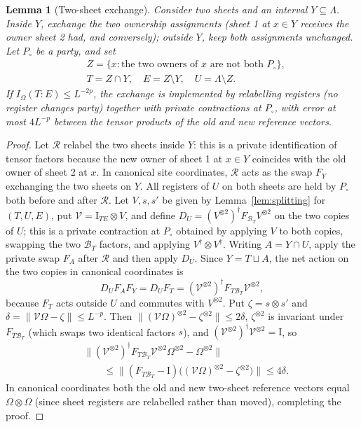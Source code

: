 \documentclass[aps,prx,reprint,superscriptaddress,floatfix,nofootinbib,longbibliography,amsmath,amssymb]{revtex4-2}
\newcommand{\id}{\mathrm{I}}
\newcommand{\norm}[1]{\lVert #1\rVert}
\newcommand{\cB}{\mathcal B}
\newcommand{\Om}{\Omega}
\newcommand{\Lam}{\Lambda}
\theoremstyle{plain}
\newtheorem{lemma}[theorem]{Lemma}
\theoremstyle{definition}
\begin{document}
\begin{lemma}[Two-sheet exchange]\label{lem:exchange}
Consider two sheets and an interval $Y\subseteq\Lam$. Inside $Y$, exchange
the two ownership assignments (sheet 1 at $x\in Y$ receives the owner sheet 2
had, and conversely); outside $Y$, keep both assignments unchanged. Let $P_\circ$ be a party, and set
\[
\begin{split}
 &Z=\{x:\text{the two owners of }x\text{ are not both }P_\circ\},\\
 &T=Z\cap Y,\quad E=Z\setminus Y,\quad U=\Lam\setminus Z .
\end{split}
\]
If $I_\Om(T:E)\le L^{-2p}$, the exchange is implemented by relabelling
registers (no register changes party) together with private contractions at
$P_\circ$, with error at most $4L^{-p}$ between the tensor products of the old and
new reference vectors.
\end{lemma}
\begin{proof}
Let $\mathcal R$ relabel the two sheets inside $Y$: this is a private identification
of tensor factors because the new owner of sheet 1 at $x\in Y$ coincides with the old
owner of sheet 2 at $x$. In canonical site coordinates, $\mathcal R$ acts as the
swap $F_{Y}$ exchanging the two sheets on $Y$. All registers of $U$ on both sheets
are held by $P_\circ$ both before and after $\mathcal R$. Let $V,s,s'$ be given by
Lemma~\ref{lem:splitting} for $(T,U,E)$, put $\mathcal V=\id_{TE}\otimes V$, and
define $D_U=(V^{\otimes2})^\dagger F_{\cB_T}V^{\otimes2}$ on the two copies of
$U$; this is a private contraction at $P_\circ$ obtained by applying $V$ to both copies, swapping the
two $\cB_T$ factors, and applying $V^\dagger\otimes V^\dagger$. Writing $A=Y\cap U$, apply the private swap $F_A$ after
$\mathcal R$ and then apply $D_U$. Since
$Y=T\sqcup A$, the net action on the two copies in canonical coordinates is
\[
 D_UF_AF_Y=D_UF_T=(\mathcal V^{\otimes2})^\dagger F_{T\cB_T}\mathcal V^{\otimes2},
\]
because $F_T$ acts outside $U$ and commutes with $V^{\otimes2}$. Put
$\zeta=s\otimes s'$ and $\delta=\norm{\mathcal V\Om-\zeta}\le L^{-p}$. Then
$\norm{(\mathcal V\Om)^{\otimes2}-\zeta^{\otimes2}}\le2\delta$, $\zeta^{\otimes2}$
is invariant under $F_{T\cB_T}$ (which swaps two identical factors $s$), and
$(\mathcal V^{\otimes2})^\dagger\mathcal V^{\otimes2}=\id$, so
\[
\begin{split}
 &\bigl\|(\mathcal V^{\otimes2})^\dagger F_{T\cB_T}\mathcal V^{\otimes2}\Om^{\otimes2}-\Om^{\otimes2}\bigr\|\\
 &\qquad\le\norm{(F_{T\cB_T}-\id)\bigl((\mathcal V\Om)^{\otimes2}-\zeta^{\otimes2}\bigr)}\le4\delta .
\end{split}
\]
In canonical coordinates both the old and new two-sheet reference vectors equal
$\Om\otimes\Om$ (since sheet registers are relabelled rather than moved), completing the proof.
\end{proof}
\end{document}
